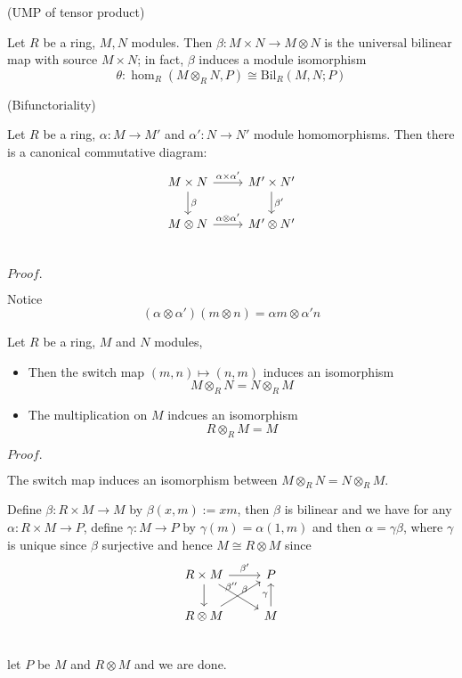 \documentclass{article}
\newcommand{\Pf}[1]{$Proof.$\par}
\begin{document}
\begin{theorem}
    (UMP of tensor product)\par
    Let $R$ be a ring, $M,N$ modules. Then $\beta:M\times N \to M\otimes N$ is the universal bilinear map with source $M\times N$; in fact, $\beta$ induces a module isomorphism
    \[\theta:\hom_R(M\otimes_R N, P) \cong \text{Bil}_R(M,N;P)\]
\end{theorem}

\begin{corollary}
    (Bifunctoriality)\par
    Let $R$ be a ring, $\alpha:M\to M'$ and $\alpha':N\to N'$ module homomorphisms. Then there is a canonical commutative diagram:
    \[
    \begin{tikzcd}
        M\times N\arrow[r,"\alpha\times\alpha'"]\arrow[d,"\beta"] & M'\times N'\arrow[d,"\beta'"]\\
        M\otimes N\arrow[r, "\alpha\otimes\alpha'"] & M'\otimes N' \\
    \end{tikzcd}
    \]
\end{corollary}
\Pf\par
    Notice
    \[
    (\alpha\otimes \alpha')(m\otimes n) = \alpha m\otimes \alpha'n
    \]

\begin{proposition}
    Let $R$ be a ring, $M$ and $N$ modules,
    \begin{itemize}
        \item Then the switch map $(m,n)\mapsto (n,m)$ induces an isomorphism
        \[M\otimes_R N = N\otimes_R M\]
        \item The multiplication on $M$ indcues an isomorphism
        \[R\otimes_R M = M\]
    \end{itemize}
\end{proposition}
\Pf\par
    The switch map induces an isomorphism between $M\otimes_RN = N\otimes_R M$.\par
    Define $\beta:R\times M \to M$ by $\beta(x,m):= xm$, then $\beta$ is bilinear and we have
    for any $\alpha:R\times M\to P$, define $\gamma:M\to P$ by $\gamma(m) = \alpha(1,m)$ and then $\alpha = \gamma\beta$, where $\gamma$ is unique since $\beta$ surjective and hence $M\cong R\otimes M$ since
    \[
    \begin{tikzcd}
        R\times M\arrow[r,"\beta'"]\arrow[d]\arrow[rd,"\beta"] & P \\
        R\otimes M\arrow[ru,"\beta''"] & M \arrow[u,"\gamma"]\\
    \end{tikzcd}
    \]
    let $P$ be $M$ and $R\otimes M$ and we are done.
\end{document}
